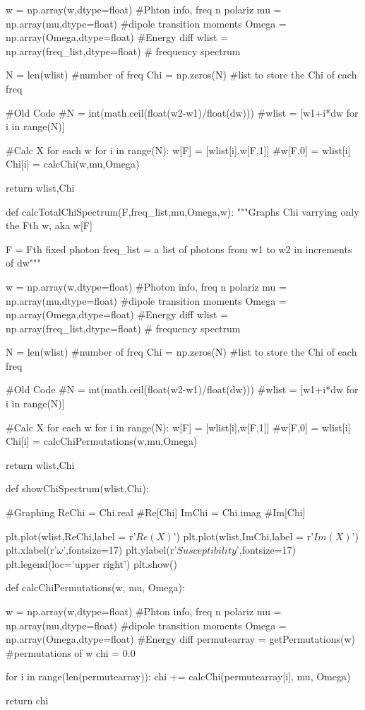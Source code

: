 \documentclass[11pt,a4paper,notitlepage]{article}
\begin{document}
\begin{code}
    w = np.array(w,dtype=float) #Phton info, freq n polariz
    mu = np.array(mu,dtype=float) #dipole transition moments
    Omega = np.array(Omega,dtype=float) #Energy diff
    wlist = np.array(freq_list,dtype=float) # frequency spectrum
   
    N = len(wlist) #number of freq
    Chi = np.zeros(N) #list to store the Chi of each freq

    #Old Code
    #N     = int(math.ceil(float(w2-w1)/float(dw)))
    #wlist = [w1+i*dw for i in range(N)]
    
    
    
    #Calc X for each w
    for i in range(N):
        w[F]   = [wlist[i],w[F,1]]
        #w[F,0]  = wlist[i]
        Chi[i]  = calcChi(w,mu,Omega)
    
    return wlist,Chi

def calcTotalChiSpectrum(F,freq_list,mu,Omega,w):
    """Graphs Chi varrying only the Fth w, aka w[F]
        
        F  = Fth fixed photon
        freq_list = a list of photons from w1 to w2 in increments of dw"""
    
    w = np.array(w,dtype=float) #Photon info, freq n polariz
    mu = np.array(mu,dtype=float) #dipole transition moments
    Omega = np.array(Omega,dtype=float) #Energy diff
    wlist = np.array(freq_list,dtype=float) # frequency spectrum
    
    N = len(wlist) #number of freq
    Chi = np.zeros(N) #list to store the Chi of each freq
    
    #Old Code
    #N     = int(math.ceil(float(w2-w1)/float(dw)))
    #wlist = [w1+i*dw for i in range(N)]
    
    
    #Calc X for each w
    for i in range(N):
        w[F]   = [wlist[i],w[F,1]]
        #w[F,0]  = wlist[i]
        Chi[i]  = calcChiPermutations(w,mu,Omega)
    
    return wlist,Chi


def showChiSpectrum(wlist,Chi):

    #Graphing
    ReChi    = Chi.real                #Re[Chi]
    ImChi    = Chi.imag                #Im[Chi]

    plt.plot(wlist,ReChi,label = r'$Re(X)$')
    plt.plot(wlist,ImChi,label = r'$Im(X)$')
    plt.xlabel(r'$\omega$',fontsize=17)
    plt.ylabel(r'$Susceptibility$',fontsize=17)
    plt.legend(loc='upper right')
    plt.show()

def calcChiPermutations(w, mu, Omega):
    
    w = np.array(w,dtype=float)       #Phton info, freq n polariz
    mu = np.array(mu,dtype=float)      #dipole transition moments
    Omega = np.array(Omega,dtype=float)   #Energy diff
    permutearray = getPermutations(w) #permutations of w
    chi = 0.0
    
    for i in range(len(permutearray)):
        chi += calcChi(permutearray[i], mu, Omega)
    
    return chi


\end{code}
\end{document}
